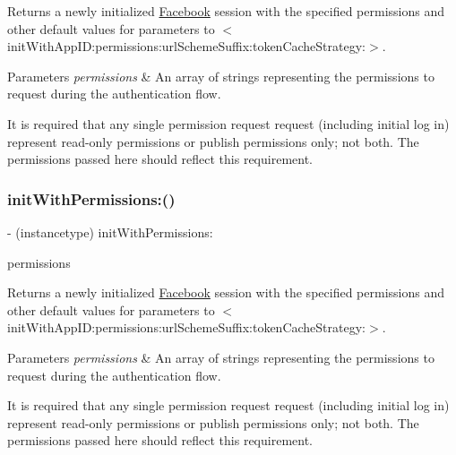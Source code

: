 Returns a newly initialized \hyperlink{interfaceFacebook}{Facebook} session with the specified permissions and other default values for parameters to $<$init\+With\+App\+I\+D\+:permissions\+:url\+Scheme\+Suffix\+:token\+Cache\+Strategy\+:$>$.


\begin{DoxyParams}{Parameters}
{\em permissions} & An array of strings representing the permissions to request during the authentication flow.\\
\hline
\end{DoxyParams}
It is required that any single permission request request (including initial log in) represent read-\/only permissions or publish permissions only; not both. The permissions passed here should reflect this requirement. \mbox{\label{interfaceFBSession_a3f8419d590fb8f950aa9aee7110fb5e6}} 
\subsubsection{\texorpdfstring{init\+With\+Permissions\+:()}{initWithPermissions:()}\hspace{0.1cm}{\footnotesize\ttfamily [5/5]}}
{\footnotesize\ttfamily -\/ (instancetype) init\+With\+Permissions\+: \begin{DoxyParamCaption}\item[{(N\+S\+Array $\ast$)}]{permissions }\end{DoxyParamCaption}}

Returns a newly initialized \hyperlink{interfaceFacebook}{Facebook} session with the specified permissions and other default values for parameters to $<$init\+With\+App\+I\+D\+:permissions\+:url\+Scheme\+Suffix\+:token\+Cache\+Strategy\+:$>$.


\begin{DoxyParams}{Parameters}
{\em permissions} & An array of strings representing the permissions to request during the authentication flow.\\
\hline
\end{DoxyParams}
It is required that any single permission request request (including initial log in) represent read-\/only permissions or publish permissions only; not both. The permissions passed here should reflect this requirement. \mbox{\label{interfaceFBSession_abe6b20f6e3202521b7ecb4115c8e865d}} 

